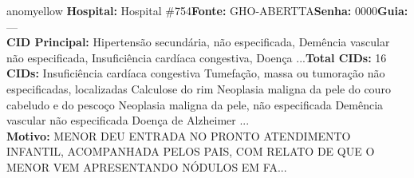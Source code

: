 \documentclass[a4paper,10pt]{article}
\begin{document}
\begin{anomalycard}[Interna\c{c}\~{a}o \#7548 | Pac. \#6297 | MODERADO (z=2.20) | LOS: 3d | 01/03/2026\,$\to$\,04/03/2026]{anomyellow}
\textbf{Hospital:} Hospital \#754\quad \textbf{Fonte:} GHO-ABERTTA\quad \textbf{Senha:} 0000\quad \textbf{Guia:} ---\\

\textbf{CID Principal:} {\small Hipertensão secundária, não especificada, Demência vascular não especificada, Insuficiência cardíaca congestiva, Doença ...}\quad\textbf{Total CIDs:} 16\\

\textbf{CIDs:} {\scriptsize Insuficiência cardíaca congestiva \textbar{} Tumefação, massa ou tumoração não especificadas, localizadas \textbar{} Calculose do rim \textbar{} Neoplasia maligna da pele do couro cabeludo e do pescoço \textbar{} Neoplasia maligna da pele, não especificada \textbar{} Demência vascular não especificada \textbar{} Doença de Alzheimer ...}\\

\textbf{Motivo:} {\scriptsize MENOR DEU ENTRADA NO PRONTO ATENDIMENTO INFANTIL, ACOMPANHADA PELOS PAIS, COM RELATO DE QUE O MENOR VEM APRESENTANDO NÓDULOS EM FA...}\\




\end{anomalycard}
\end{document}
